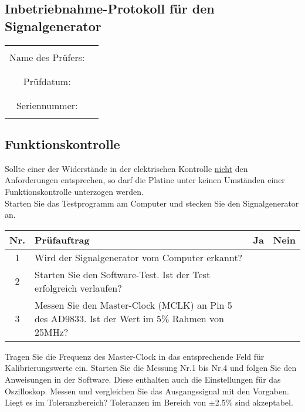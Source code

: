 \begin{center}
\section{Inbetriebnahme-Protokoll für den Signalgenerator}

	\begin{tabular}{|c|p{10cm}|}
		\hline
		& \\
		Name des Prüfers: &  \\
		& \\
		\hline
		& \\
		Prüfdatum: & \\
		& \\
		\hline
		& \\
		Seriennummer: & \\
		& \\
		\hline
	\end{tabular}
\end{center}

\subsection{Funktionskontrolle}
Sollte einer der Widerstände in der elektrischen Kontrolle \underline{nicht} den Anforderungen entsprechen, so darf die Platine unter keinen Umständen einer Funktionskontrolle unterzogen werden.\\
Starten Sie das Testprogramm am Computer und stecken Sie den Signalgenerator an.
\begin{flushleft}
	\begin{tabular}{|c||p{10cm}|c|c|}
		\hline
		Nr. & Prüfauftrag & Ja & Nein\\
		\hline
		1 & Wird der Signalgenerator vom Computer erkannt? & & \\
		\hline
		2 & Starten Sie den Software-Test. Ist der Test erfolgreich verlaufen? & & \\
		\hline
		3 & Messen Sie den Master-Clock (MCLK) an Pin 5 des AD9833. Ist der Wert im 5\% Rahmen von 25MHz? & & \\
		\hline
	\end{tabular}
\end{flushleft}
Tragen Sie die Frequenz des Master-Clock in das entsprechende Feld für Kalibrierungswerte ein.
\medskip		
Starten Sie die Messung Nr.1 bis Nr.4 und folgen Sie den Anweisungen in der Software. Diese enthalten auch die Einstellungen für das Oszilloskop. Messen und vergleichen Sie das Ausgangssignal mit den Vorgaben. Liegt es im Toleranzbereich? Toleranzen im Bereich von $\pm$2.5\% sind akzeptabel.

